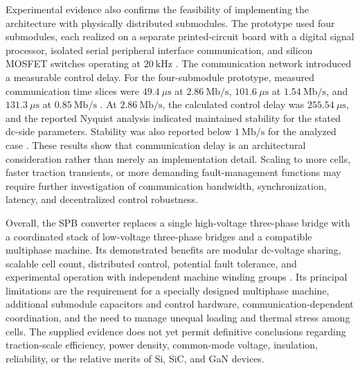 Experimental evidence also confirms the feasibility of implementing the architecture with physically distributed submodules. The prototype used four submodules, each realized on a separate printed-circuit board with a digital signal processor, isolated serial peripheral interface communication, and silicon MOSFET switches operating at \(20~\mathrm{kHz}\) \cite{Jin2017}. The communication network introduced a measurable control delay. For the four-submodule prototype, measured communication time slices were \(49.4~\mu\mathrm{s}\) at \(2.86~\mathrm{Mb/s}\), \(101.6~\mu\mathrm{s}\) at \(1.54~\mathrm{Mb/s}\), and \(131.3~\mu\mathrm{s}\) at \(0.85~\mathrm{Mb/s}\) \cite{Jin2017}. At \(2.86~\mathrm{Mb/s}\), the calculated control delay was \(255.54~\mu\mathrm{s}\), and the reported Nyquist analysis indicated maintained stability for the stated dc-side parameters. Stability was also reported below \(1~\mathrm{Mb/s}\) for the analyzed case \cite{Jin2017}. These results show that communication delay is an architectural consideration rather than merely an implementation detail. Scaling to more cells, faster traction transients, or more demanding fault-management functions may require further investigation of communication bandwidth, synchronization, latency, and decentralized control robustness. %

Overall, the SPB converter replaces a single high-voltage three-phase bridge with a coordinated stack of low-voltage three-phase bridges and a compatible multiphase machine. Its demonstrated benefits are modular dc-voltage sharing, scalable cell count, distributed control, potential fault tolerance, and experimental operation with independent machine winding groups \cite{Jin2017}. Its principal limitations are the requirement for a specially designed multiphase machine, additional submodule capacitors and control hardware, communication-dependent coordination, and the need to manage unequal loading and thermal stress among cells. The supplied evidence does not yet permit definitive conclusions regarding traction-scale efficiency, power density, common-mode voltage, insulation, reliability, or the relative merits of Si, SiC, and GaN devices. %